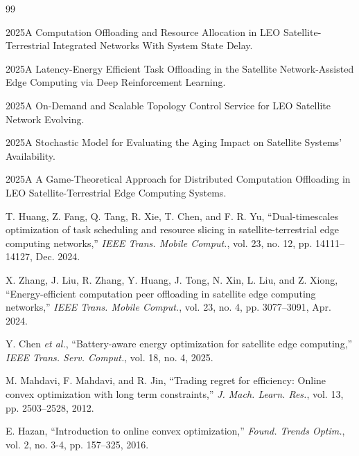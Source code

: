 \documentclass[a4paper,11pt]{article}
\begin{document}
\begin{thebibliography}{99}

2025A Computation Offloading and Resource Allocation in LEO
Satellite-Terrestrial Integrated Networks With System State Delay.

2025A Latency-Energy Efficient Task Offloading in the
Satellite Network-Assisted Edge Computing via Deep Reinforcement Learning.

2025A On-Demand and Scalable Topology Control Service
for LEO Satellite Network Evolving.

2025A Stochastic Model for Evaluating the Aging Impact
on Satellite Systems' Availability.

2025A A Game-Theoretical Approach for Distributed
Computation Offloading in LEO Satellite-Terrestrial
Edge Computing Systems.

T. Huang, Z. Fang, Q. Tang, R. Xie, T. Chen, and F. R. Yu,
``Dual-timescales optimization of task scheduling and resource
slicing in satellite-terrestrial edge computing networks,''
\textit{IEEE Trans. Mobile Comput.},
vol. 23, no. 12, pp. 14111--14127, Dec. 2024.

X. Zhang, J. Liu, R. Zhang, Y. Huang, J. Tong, N. Xin,
L. Liu, and Z. Xiong,
``Energy-efficient computation peer offloading in satellite
edge computing networks,''
\textit{IEEE Trans. Mobile Comput.},
vol. 23, no. 4, pp. 3077--3091, Apr. 2024.

Y. Chen \textit{et al.},
``Battery-aware energy optimization for satellite edge computing,''
\textit{IEEE Trans. Serv. Comput.},
vol. 18, no. 4, 2025.

M. Mahdavi, F. Mahdavi, and R. Jin,
``Trading regret for efficiency: Online convex optimization
with long term constraints,''
\textit{J. Mach. Learn. Res.},
vol. 13, pp. 2503--2528, 2012.

E. Hazan,
``Introduction to online convex optimization,''
\textit{Found. Trends Optim.},
vol. 2, no. 3-4, pp. 157--325, 2016.

\end{thebibliography}
\end{document}
